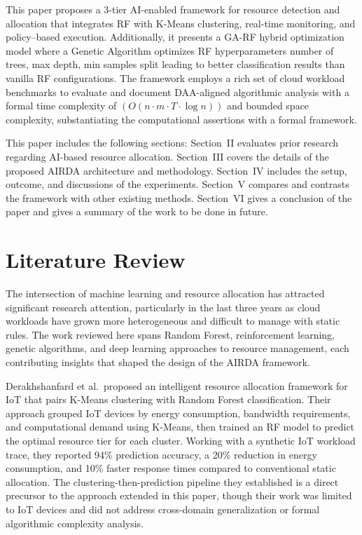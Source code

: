 \documentclass[conference]{IEEEtran}
\begin{document}
This paper proposes a 3-tier AI-enabled framework for resource detection and allocation that integrates RF with K-Means clustering, real-time monitoring, and policy--based execution. Additionally, it presents a GA-RF hybrid optimization model where a Genetic Algorithm optimizes RF hyperparameters number of trees, max depth, min samples split leading to better classification results than vanilla RF configurations. The framework employs a rich set of cloud workload benchmarks to evaluate and document DAA-aligned algorithmic analysis with a formal time complexity of $(O(n \cdot m \cdot T \cdot \log n))$ and bounded space complexity, substantiating the computational assertions with a formal framework.

This paper includes the following sections: Section~II evaluates prior research regarding AI-based resource allocation. Section~III covers the details of the proposed AIRDA architecture and methodology. Section~IV includes the setup, outcome, and discussions of the experiments. Section~V compares and contrasts the framework with other existing methods. Section~VI gives a conclusion of the paper and gives a summary of the work to be done in future.

\section{\textbf{Literature Review}}

The intersection of machine learning and resource allocation has attracted significant research attention, particularly in the last three years as cloud workloads have grown more heterogeneous and difficult to manage with static rules. The work reviewed here spans Random Forest, reinforcement learning, genetic algorithms, and deep learning approaches to resource management, each contributing insights that shaped the design of the AIRDA framework.

Derakhshanfard et al.\ proposed an intelligent resource allocation framework for IoT that pairs K-Means clustering with Random Forest classification. Their approach grouped IoT devices by energy consumption, bandwidth requirements, and computational demand using K-Means, then trained an RF model to predict the optimal resource tier for each cluster. Working with a synthetic IoT workload trace, they reported 94\% prediction accuracy, a 20\% reduction in energy consumption, and 10\% faster response times compared to conventional static allocation. The clustering-then-prediction pipeline they established is a direct precursor to the approach extended in this paper, though their work was limited to IoT devices and did not address cross-domain generalization or formal algorithmic complexity analysis.~\cite{Ref1}
\end{document}
